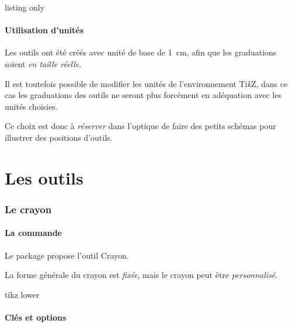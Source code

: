 \documentclass[french,a4paper,11pt]{article}
\providecommand\tikzlogo{Ti\textit{k}Z}
\let\TikZ\tikzlogo
\begin{document}
\begin{PresentationCode}{listing only}
\tkzRegle[clés]
\tkzEquerre[clés]
\tkzRapporteur[clés]
\tkzRequerre[clés]
\tkzRappEquerre[clés]
\tkzCrayon[clés]
\end{PresentationCode}

\subsection{Utilisation d'unités}

\begin{tipblock}
Les outils ont été créés avec unité de base de 1~cm, afin que les graduations soient \textit{en taille réelle}.

\smallskip

Il est toutefois possible de modifier les unités de l'environnement \TikZ, dans ce cas les graduations des outils ne seront plus forcément en adéquation avec les unités choisies.

\smallskip

Ce choix est donc à \textit{réserver} dans l'optique de faire des petits schémas pour illustrer des positions d'outils.
\end{tipblock}

\pagebreak

\part{Les outils}

\section{Le crayon}

\subsection{La commande}

\begin{cautionblock}
Le package propose l'outil \textsf{Crayon}.

La forme générale du crayon est \textit{fixée}, mais le crayon peut être \textit{personnalisé}.
\end{cautionblock}

\begin{PresentationCode}{tikz lower}
\tkzCrayon
\end{PresentationCode}

\subsection{Clés et options}
\end{document}
